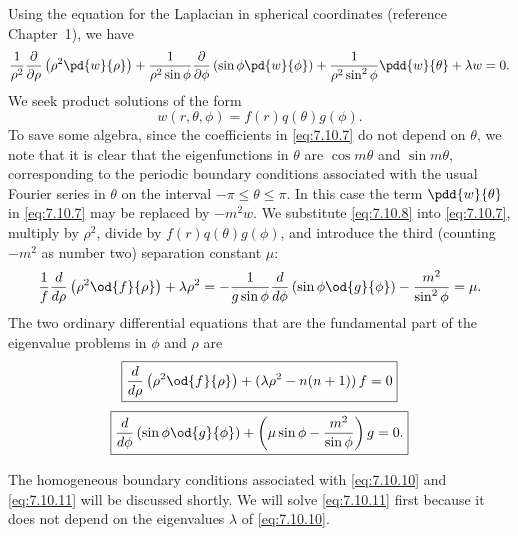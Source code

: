 Using the equation for the Laplacian in spherical coordinates (reference Chapter~1), we have
\begin{equation}
\frac{1}{\rho^2}\frac{\partial}{\partial \rho}\left(\rho^2\pd{w}{\rho}\right) + \frac{1}{\rho^2\sin\phi}\frac{\partial}{\partial \phi}\left(\sin\phi\pd{w}{\phi}\right) + \frac{1}{\rho^2\sin^2\phi}\pdd{w}{\theta} + \lambda w = 0.
\label{eq:7.10.7}
\end{equation}
We seek product solutions of the form
\begin{equation}
w(r,\theta,\phi) = f(r)q(\theta)g(\phi).
\label{eq:7.10.8}
\end{equation}
To save some algebra, since the coefficients in \eqref{eq:7.10.7} do not depend on $\theta$, we note that it is clear that the eigenfunctions in $\theta$ are $\cos m\theta$ and $\sin m\theta$, corresponding to the periodic boundary conditions associated with the usual Fourier series in $\theta$ on the interval $-\pi \leq \theta \leq \pi$.  In this case the term $\pdd{w}{\theta}$ in \eqref{eq:7.10.7} may be replaced by $-m^2 w$.  We substitute \eqref{eq:7.10.8} into \eqref{eq:7.10.7}, multiply by $\rho^2$, divide by $f(r)q(\theta)g(\phi)$, and introduce the third (counting $-m^2$ as number two) separation constant $\mu$:
\begin{equation}
\frac{1}{f}\frac{d}{d \rho}\left(\rho^2\od{f}{\rho}\right) + \lambda\rho^2 = -\frac{1}{g\sin\phi}\frac{d}{d \phi}\left(\sin\phi\od{g}{\phi}\right) - \frac{m^2}{\sin^2\phi} = \mu.
\label{eq:7.10.9}
\end{equation}
The two ordinary differential equations that are the fundamental part of the eigenvalue problems in $\phi$ and $\rho$ are
\begin{equation}
\boxed{\frac{d}{d \rho}\left(\rho^2\od{f}{\rho}\right) + (\lambda\rho^2 - n(n+1))\,f = 0}
\label{eq:7.10.10}
\end{equation}
\begin{equation}
\boxed{\frac{d}{d \phi}\left(\sin\phi\od{g}{\phi}\right) + \left(\mu\sin\phi - \frac{m^2}{\sin\phi}\right)g = 0.}
\label{eq:7.10.11}
\end{equation}

The homogeneous boundary conditions associated with \eqref{eq:7.10.10} and \eqref{eq:7.10.11} will be discussed shortly.  We will solve \eqref{eq:7.10.11} first because it does not depend on the eigenvalues $\lambda$ of \eqref{eq:7.10.10}.

